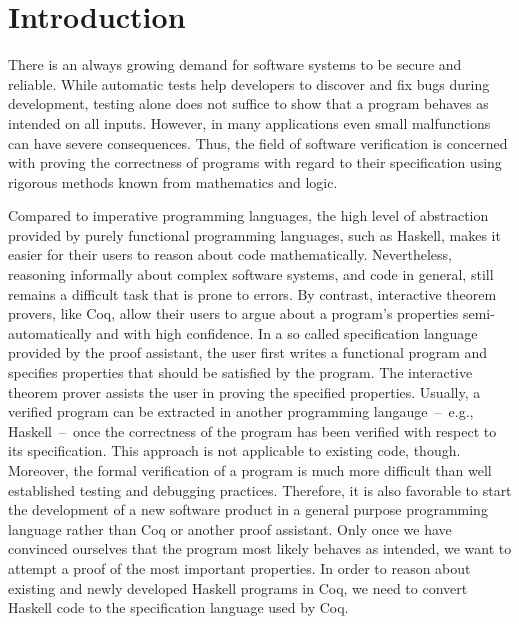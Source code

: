 \chapter{Introduction} \label{chp:introduction}
There is an always growing demand for software systems to be secure and reliable.
While automatic tests help developers to discover and fix bugs during development, testing alone does not suffice to show that a program behaves as intended on all inputs.
However, in many applications even small malfunctions can have severe consequences.
Thus, the field of software verification is concerned with proving the correctness of programs with regard to their specification using rigorous methods known from mathematics and logic.

Compared to imperative programming languages, the high level of abstraction provided by purely functional programming languages, such as Haskell, makes it easier for their users to reason about code mathematically.
Nevertheless, reasoning informally about complex software systems, and code in general, still remains a difficult task that is prone to errors.
By contrast, interactive theorem provers, like Coq, allow their users to argue about a program's properties semi-automatically and with high confidence.
In a so called specification language provided by the proof assistant, the user first writes a functional program and specifies properties that should be satisfied by the program.
The interactive theorem prover assists the user in proving the specified properties.
Usually, a verified program can be extracted in another programming langauge~--~e.g., Haskell~--~once the correctness of the program has been verified with respect to its specification.
This approach is not applicable to existing code, though.
Moreover, the formal verification of a program is much more difficult than well established testing and debugging practices.
Therefore, it is also favorable to start the development of a new software product in a general purpose programming language rather than Coq or another proof assistant.
Only once we have convinced ourselves that the program most likely behaves as intended, we want to attempt a proof of the most important properties.
In order to reason about existing and newly developed Haskell programs in Coq, we need to convert Haskell code to the specification language used by Coq.


